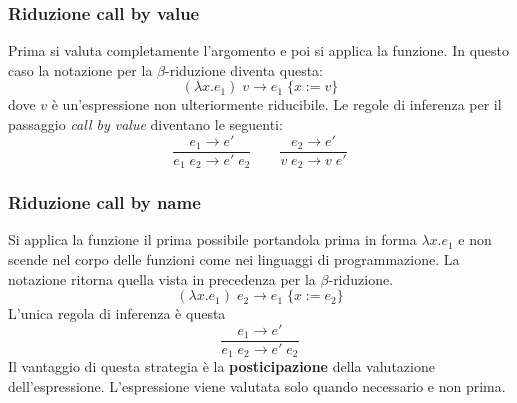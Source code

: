 \subsubsection{Riduzione call by value}
Prima si valuta completamente l'argomento e poi si applica la funzione. In questo caso la notazione per la
$\beta$-riduzione diventa questa:
\[ (\lambda x.e_1) \; v \rightarrow e_1 \; \{ x := v \} \]
dove $v$ è un'espressione non ulteriormente riducibile. Le regole di inferenza per il passaggio \emph{call by value}
diventano le seguenti:
\[
	\frac{e_1 \rightarrow e'}{e_1 \; e_2 \rightarrow e' \; e_2} \quad \quad
	\frac{e_2 \rightarrow e'}{v \; e_2 \rightarrow v \; e'}
\]

\subsubsection{Riduzione call by name}
Si applica la funzione il prima possibile portandola prima in forma $\lambda x.e_1$ e non scende nel corpo delle
funzioni come nei linguaggi di programmazione. La notazione ritorna quella vista in precedenza per la $\beta$-riduzione.
\[ (\lambda x.e_1) \; e_2 \rightarrow e_1 \; \{ x := e_2 \} \]
L'unica regola di inferenza è questa
\[ \frac{e_1 \rightarrow e'}{e_1 \; e_2 \rightarrow e' \; e_2} \]
Il vantaggio di questa strategia è la \textbf{posticipazione} della valutazione dell'espressione. L'espressione viene
valutata solo quando necessario e non prima.